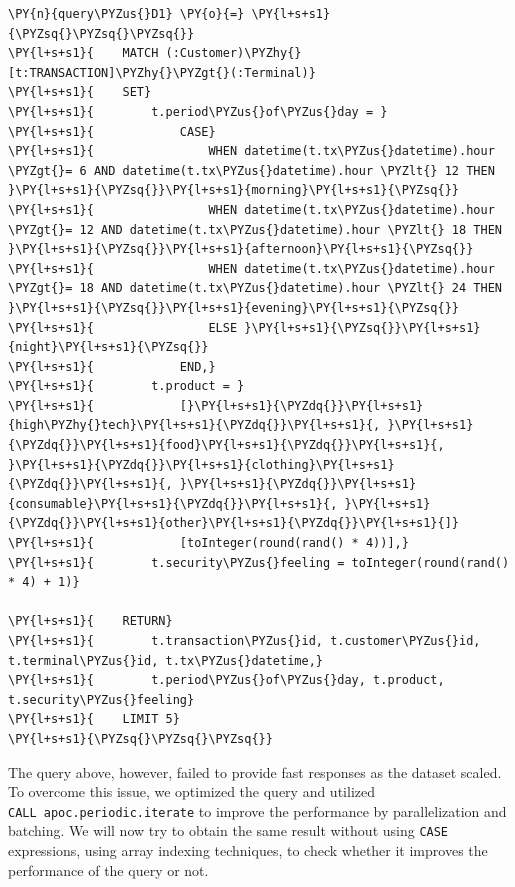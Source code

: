     \begin{tcolorbox}[breakable, size=fbox, boxrule=1pt, pad at break*=1mm,colback=cellbackground, colframe=cellborder]
\begin{Verbatim}[commandchars=\\\{\}]
\PY{n}{query\PYZus{}D1} \PY{o}{=} \PY{l+s+s1}{\PYZsq{}\PYZsq{}\PYZsq{}}
\PY{l+s+s1}{    MATCH (:Customer)\PYZhy{}[t:TRANSACTION]\PYZhy{}\PYZgt{}(:Terminal)}
\PY{l+s+s1}{    SET}
\PY{l+s+s1}{        t.period\PYZus{}of\PYZus{}day = }
\PY{l+s+s1}{            CASE}
\PY{l+s+s1}{                WHEN datetime(t.tx\PYZus{}datetime).hour \PYZgt{}= 6 AND datetime(t.tx\PYZus{}datetime).hour \PYZlt{} 12 THEN }\PY{l+s+s1}{\PYZsq{}}\PY{l+s+s1}{morning}\PY{l+s+s1}{\PYZsq{}}
\PY{l+s+s1}{                WHEN datetime(t.tx\PYZus{}datetime).hour \PYZgt{}= 12 AND datetime(t.tx\PYZus{}datetime).hour \PYZlt{} 18 THEN }\PY{l+s+s1}{\PYZsq{}}\PY{l+s+s1}{afternoon}\PY{l+s+s1}{\PYZsq{}}
\PY{l+s+s1}{                WHEN datetime(t.tx\PYZus{}datetime).hour \PYZgt{}= 18 AND datetime(t.tx\PYZus{}datetime).hour \PYZlt{} 24 THEN }\PY{l+s+s1}{\PYZsq{}}\PY{l+s+s1}{evening}\PY{l+s+s1}{\PYZsq{}}
\PY{l+s+s1}{                ELSE }\PY{l+s+s1}{\PYZsq{}}\PY{l+s+s1}{night}\PY{l+s+s1}{\PYZsq{}}
\PY{l+s+s1}{            END,}
\PY{l+s+s1}{        t.product = }
\PY{l+s+s1}{            [}\PY{l+s+s1}{\PYZdq{}}\PY{l+s+s1}{high\PYZhy{}tech}\PY{l+s+s1}{\PYZdq{}}\PY{l+s+s1}{, }\PY{l+s+s1}{\PYZdq{}}\PY{l+s+s1}{food}\PY{l+s+s1}{\PYZdq{}}\PY{l+s+s1}{, }\PY{l+s+s1}{\PYZdq{}}\PY{l+s+s1}{clothing}\PY{l+s+s1}{\PYZdq{}}\PY{l+s+s1}{, }\PY{l+s+s1}{\PYZdq{}}\PY{l+s+s1}{consumable}\PY{l+s+s1}{\PYZdq{}}\PY{l+s+s1}{, }\PY{l+s+s1}{\PYZdq{}}\PY{l+s+s1}{other}\PY{l+s+s1}{\PYZdq{}}\PY{l+s+s1}{]}
\PY{l+s+s1}{            [toInteger(round(rand() * 4))],}
\PY{l+s+s1}{        t.security\PYZus{}feeling = toInteger(round(rand() * 4) + 1)}

\PY{l+s+s1}{    RETURN}
\PY{l+s+s1}{        t.transaction\PYZus{}id, t.customer\PYZus{}id, t.terminal\PYZus{}id, t.tx\PYZus{}datetime,}
\PY{l+s+s1}{        t.period\PYZus{}of\PYZus{}day, t.product, t.security\PYZus{}feeling}
\PY{l+s+s1}{    LIMIT 5}
\PY{l+s+s1}{\PYZsq{}\PYZsq{}\PYZsq{}}
\end{Verbatim}
\end{tcolorbox}

    The query above, however, failed to provide fast responses as the
dataset scaled. To overcome this issue, we optimized the query and
utilized \texttt{CALL\ apoc.periodic.iterate} to improve the performance
by parallelization and batching. We will now try to obtain the same
result without using \texttt{CASE} expressions, using array indexing
techniques, to check whether it improves the performance of the query or
not.

